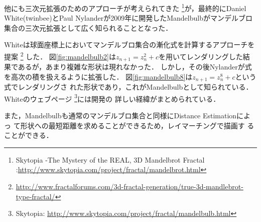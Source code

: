 他にも三次元拡張のためのアプローチが考えられてきた
\footnote{Skytopia -The Mystery of the REAL, 3D Mandelbrot Fractal
:\url{http://www.skytopia.com/project/fractal/mandelbrot.html}}が，最終的にDaniel
White(twinbee)とPaul Nylanderが2009年に開発したMandelbulbがマンデルブロ
集合の三次元拡張として広く知られることとなった．

Whiteは球面座標上においてマンデルブロ集合の漸化式を計算するアプローチを提案
\footnote{\url{http://www.fractalforums.com/3d-fractal-generation/true-3d-mandlebrot-type-fractal/}}
した．
図\ref{fig:mandelbulb2}は$z_{n+1} = z_n^2 + c$を用いてレンダリングした結
果であるが，あまり複雑な形状は現れなかった．
しかし，その後Nylanderが式を高次の積を扱えるように拡張した．
図\ref{fig:mandelbulb8}は$z_{n+1} = z_n^8 + c $という式でレンダリングさ
れた形状であり，これがMandelbulbとして知られている．Whiteのウェブページ
\footnote{Skytopia:
\url{http://www.skytopia.com/project/fractal/mandelbulb.html}}には開発の
詳しい経緯がまとめられている．

また，Mandelbulbも通常のマンデルブロ集合と同様にDistance Estimationによっ
て形状への最短距離を求めることができるため，レイマーチングで描画す
ることができる．

